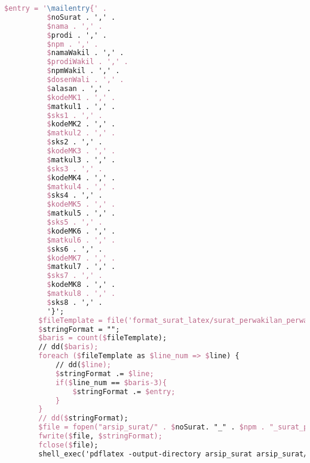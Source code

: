 \begin{lstlisting}[language=tex,basicstyle=\tiny,caption=HistorysuratController.php]
        $entry = '\mailentry{' .
          $noSurat . ',' .
          $nama . ',' .
          $prodi . ',' .
          $npm . ',' .
          $namaWakil . ',' .
          $prodiWakil . ',' .
          $npmWakil . ',' .
          $dosenWali . ',' .
          $alasan . ',' .
          $kodeMK1 . ',' .
          $matkul1 . ',' .
          $sks1 . ',' .
          $kodeMK2 . ',' .
          $matkul2 . ',' .
          $sks2 . ',' .
          $kodeMK3 . ',' .
          $matkul3 . ',' .
          $sks3 . ',' .
          $kodeMK4 . ',' .
          $matkul4 . ',' .
          $sks4 . ',' .
          $kodeMK5 . ',' .
          $matkul5 . ',' .
          $sks5 . ',' .
          $kodeMK6 . ',' .
          $matkul6 . ',' .
          $sks6 . ',' .
          $kodeMK7 . ',' .
          $matkul7 . ',' .
          $sks7 . ',' .
          $kodeMK8 . ',' .
          $matkul8 . ',' .
          $sks8 . ',' .
          '}';
        $fileTemplate = file('format_surat_latex/surat_perwakilan_perwalian_8mk.tex');
        $stringFormat = "";
        $baris = count($fileTemplate);
        // dd($baris);
        foreach ($fileTemplate as $line_num => $line) {
            // dd($line);
            $stringFormat .= $line;
            if($line_num == $baris-3){
                $stringFormat .= $entry;
            }
        }
        // dd($stringFormat);
        $file = fopen("arsip_surat/" . $noSurat. "_" . $npm . "_surat_perwakilan_perwalian_8mk.tex", "w");
        fwrite($file, $stringFormat);
        fclose($file);
        shell_exec('pdflatex -output-directory arsip_surat arsip_surat/' . $noSurat . '_' . $npm . '_surat_perwakilan_perwalian_8mk.tex');


\end{lstlisting}
